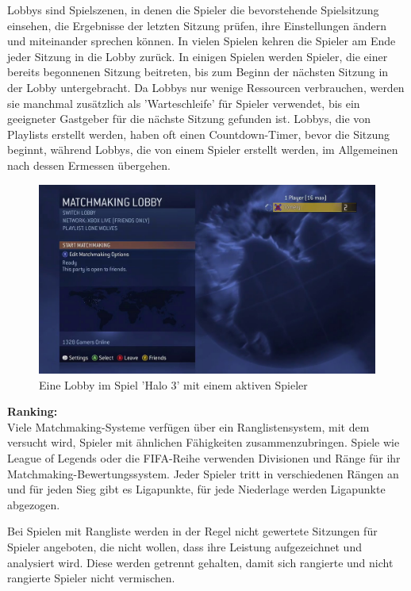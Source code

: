 Lobbys sind Spielszenen, in denen die Spieler die bevorstehende Spielsitzung einsehen, die Ergebnisse der letzten Sitzung prüfen, ihre Einstellungen ändern und miteinander sprechen können. In vielen Spielen kehren die Spieler am Ende jeder Sitzung in die Lobby zurück. In einigen Spielen werden Spieler, die einer bereits begonnenen Sitzung beitreten, bis zum Beginn der nächsten Sitzung in der Lobby untergebracht. Da Lobbys nur wenige Ressourcen verbrauchen, werden sie manchmal zusätzlich als 'Warteschleife' für Spieler verwendet, bis ein geeigneter Gastgeber für die nächste Sitzung gefunden ist. Lobbys, die von Playlists erstellt werden, haben oft einen Countdown-Timer, bevor die Sitzung beginnt, während Lobbys, die von einem Spieler erstellt werden, im Allgemeinen nach dessen Ermessen übergehen. \cite{Wikipedia.2021b}

\begin{figure}[H]
	\centering
	\includegraphics[width=120mm]{images/halo3_lobby.jpg}
	\caption['Halo 3' Lobby]{Eine Lobby im Spiel 'Halo 3' mit einem aktiven Spieler}
	\label{pic:Dota2_Party_Invite}
\end{figure}

\textbf{Ranking:} \\
Viele Matchmaking-Systeme verfügen über ein Ranglistensystem, mit dem versucht wird, Spieler mit ähnlichen Fähigkeiten zusammenzubringen. Spiele wie League of Legends oder die FIFA-Reihe verwenden Divisionen und Ränge für ihr Matchmaking-Bewertungssystem. Jeder Spieler tritt in verschiedenen Rängen an und für jeden Sieg gibt es Ligapunkte, für jede Niederlage werden Ligapunkte abgezogen.

Bei Spielen mit Rangliste werden in der Regel nicht gewertete Sitzungen für Spieler angeboten, die nicht wollen, dass ihre Leistung aufgezeichnet und analysiert wird. Diese werden getrennt gehalten, damit sich rangierte und nicht rangierte Spieler nicht vermischen. \cite{Wikipedia.2021b}


